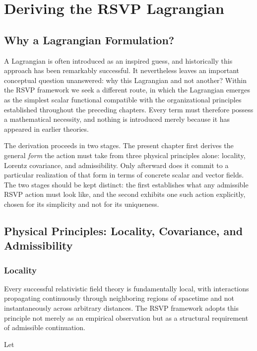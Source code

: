 \documentclass[11pt,oneside]{book}
\numberwithin{equation}{chapter}
\theoremstyle{definition}
\theoremstyle{plain}
\begin{document}
\chapter{Deriving the RSVP Lagrangian}

\section{Why a Lagrangian Formulation?}

A Lagrangian is often introduced as an inspired guess, and historically this approach has been remarkably successful. It nevertheless leaves an important conceptual question unanswered: why this Lagrangian and not another? Within the RSVP framework we seek a different route, in which the Lagrangian emerges as the simplest scalar functional compatible with the organizational principles established throughout the preceding chapters. Every term must therefore possess a mathematical necessity, and nothing is introduced merely because it has appeared in earlier theories.

The derivation proceeds in two stages. The present chapter first derives the general \emph{form} the action must take from three physical principles alone: locality, Lorentz covariance, and admissibility. Only afterward does it commit to a particular realization of that form in terms of concrete scalar and vector fields. The two stages should be kept distinct: the first establishes what any admissible RSVP action must look like, and the second exhibits one such action explicitly, chosen for its simplicity and not for its uniqueness.

\section{Physical Principles: Locality, Covariance, and Admissibility}

\subsection*{Locality}

Every successful relativistic field theory is fundamentally local, with interactions propagating continuously through neighboring regions of spacetime and not instantaneously across arbitrary distances. The RSVP framework adopts this principle not merely as an empirical observation but as a structural requirement of admissible continuation.

Let
\end{document}
